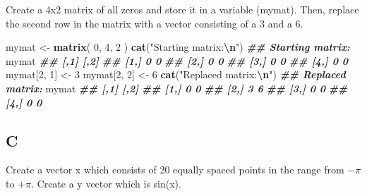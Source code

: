\documentclass[
]{article}
\newenvironment{Shaded}{\begin{snugshade}}{\end{snugshade}}
\newcommand{\DecValTok}[1]{\textcolor[rgb]{0.00,0.00,0.81}{#1}}
\newcommand{\DocumentationTok}[1]{\textcolor[rgb]{0.56,0.35,0.01}{\textbf{\textit{#1}}}}
\newcommand{\FunctionTok}[1]{\textcolor[rgb]{0.13,0.29,0.53}{\textbf{#1}}}
\newcommand{\NormalTok}[1]{#1}
\newcommand{\OtherTok}[1]{\textcolor[rgb]{0.56,0.35,0.01}{#1}}
\newcommand{\SpecialCharTok}[1]{\textcolor[rgb]{0.81,0.36,0.00}{\textbf{#1}}}
\newcommand{\StringTok}[1]{\textcolor[rgb]{0.31,0.60,0.02}{#1}}
\begin{document}
Create a 4x2 matrix of all zeros and store it in a variable (mymat).
Then, replace the second row in the matrix with a vector consisting of a
3 and a 6.

\begin{Shaded}
\begin{Highlighting}[]
\NormalTok{mymat }\OtherTok{\textless{}{-}} \FunctionTok{matrix}\NormalTok{(}
  \DecValTok{0}\NormalTok{,}
  \DecValTok{4}\NormalTok{,}
  \DecValTok{2}
\NormalTok{)}
\FunctionTok{cat}\NormalTok{(}\StringTok{"Starting matrix:}\SpecialCharTok{\textbackslash{}n}\StringTok{"}\NormalTok{)}
\DocumentationTok{\#\# Starting matrix:}
\NormalTok{mymat}
\DocumentationTok{\#\#      [,1] [,2]}
\DocumentationTok{\#\# [1,]    0    0}
\DocumentationTok{\#\# [2,]    0    0}
\DocumentationTok{\#\# [3,]    0    0}
\DocumentationTok{\#\# [4,]    0    0}
\NormalTok{mymat[}\DecValTok{2}\NormalTok{, }\DecValTok{1}\NormalTok{] }\OtherTok{\textless{}{-}} \DecValTok{3}
\NormalTok{mymat[}\DecValTok{2}\NormalTok{, }\DecValTok{2}\NormalTok{] }\OtherTok{\textless{}{-}} \DecValTok{6}
\FunctionTok{cat}\NormalTok{(}\StringTok{"Replaced matrix:}\SpecialCharTok{\textbackslash{}n}\StringTok{"}\NormalTok{)}
\DocumentationTok{\#\# Replaced matrix:}
\NormalTok{mymat}
\DocumentationTok{\#\#      [,1] [,2]}
\DocumentationTok{\#\# [1,]    0    0}
\DocumentationTok{\#\# [2,]    3    6}
\DocumentationTok{\#\# [3,]    0    0}
\DocumentationTok{\#\# [4,]    0    0}
\end{Highlighting}
\end{Shaded}

\hypertarget{c}{%
\subsection{C}\label{c}}

Create a vector x which consists of 20 equally spaced points in the
range from \(-\pi\) to \(+\pi\). Create a y vector which is sin(x).
\end{document}
